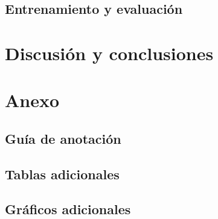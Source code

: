\documentclass[colorinlistoftodos]{article}
\begin{document}
\subsection{Entrenamiento y evaluaci\'on}\label{subsection-results-models}


\section{Discusi\'on y conclusiones}\label{section-discussion}


\newpage



\clearpage
\appendix
\section{Anexo}\label{appendix}

\subsection{Gu\'ia de anotaci\'on}\label{appendix-annotation}


\subsection{Tablas adicionales}\label{appendix-tables}


\subsection{Gr\'aficos adicionales}\label{appendix-plots}


\end{document}
